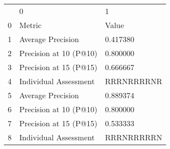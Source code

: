 \begin{tabular}{lll}
 & 0 & 1 \\
0 & Metric & Value \\
1 & Average Precision & 0.417380 \\
2 & Precision at 10 (P@10) & 0.800000 \\
3 & Precision at 15 (P@15) & 0.666667 \\
4 & Individual Assessment & RRRNRRRRNR \\
5 & Average Precision & 0.889374 \\
6 & Precision at 10 (P@10) & 0.800000 \\
7 & Precision at 15 (P@15) & 0.533333 \\
8 & Individual Assessment & RRRNRRRRRN \\
\end{tabular}
